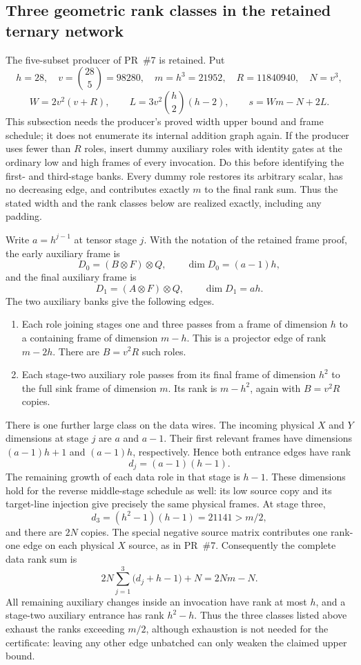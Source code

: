 \subsection{Three geometric rank classes in the retained ternary network}
\label{sec:batched-bit-rank-accounting}

The five-subset producer of PR~\#7 is retained. Put
\[
 h=28,\quad v=\binom{28}{5}=98280,\quad m=h^3=21952,
 \quad R=11840940,\quad N=v^3,
\]
\[
 W=2v^2(v+R),\qquad
 L=3v^2\binom h2(h-2),\qquad
 s=Wm-N+2L.
\]
This subsection needs the producer's proved width upper bound and frame
schedule; it does not enumerate its internal addition graph again.
If the producer uses fewer than $R$ roles, insert dummy auxiliary roles
with identity gates at the ordinary low and high frames of every invocation.
Do this before identifying the first- and third-stage banks. Every dummy
role restores its arbitrary scalar, has no decreasing edge, and contributes
exactly $m$ to the final rank sum. Thus the stated width and the rank classes
below are realized exactly, including any padding.

Write $a=h^{j-1}$ at tensor stage $j$. With the notation of the retained
frame proof, the early auxiliary frame is
\[
 D_0=(B\otimes F)\otimes Q,\qquad \dim D_0=(a-1)h,
\]
and the final auxiliary frame is
\[
 D_1=(A\otimes F)\otimes Q,\qquad \dim D_1=ah.
\]
The two auxiliary banks give the following edges.

\begin{enumerate}
\item Each role joining stages one and three passes from a frame of
      dimension $h$ to a containing frame of dimension $m-h$.
      This is a projector edge of rank $m-2h$.
      There are $B=v^2R$ such roles.
\item Each stage-two auxiliary role passes from its final frame of
      dimension $h^2$ to the full sink frame of dimension $m$.
      Its rank is $m-h^2$, again with $B=v^2R$ copies.
\end{enumerate}

There is one further large class on the data wires. The incoming physical
$X$ and $Y$ dimensions at stage $j$ are $a$ and $a-1$. Their first relevant
frames have dimensions $(a-1)h+1$ and $(a-1)h$, respectively. Hence both
entrance edges have rank
\[
 d_j=(a-1)(h-1).
\]
The remaining growth of each data role in that stage is $h-1$.
These dimensions hold for the reverse middle-stage schedule as well:
its low source copy and its target-line injection give precisely the same
physical frames. At stage three,
\[
 d_3=(h^2-1)(h-1)=21141>m/2,
\]
and there are $2N$ copies. The special negative source matrix contributes
one rank-one edge on each physical $X$ source, as in PR~\#7.
Consequently the complete data rank sum is
\[
 2N\sum_{j=1}^3\bigl(d_j+h-1\bigr)+N=2Nm-N.
\]
All remaining auxiliary changes inside an invocation have rank at most
$h$, and a stage-two auxiliary entrance has rank $h^2-h$. Thus the three
classes listed above exhaust the ranks exceeding $m/2$, although exhaustion
is not needed for the certificate: leaving any other edge unbatched can
only weaken the claimed upper bound.

